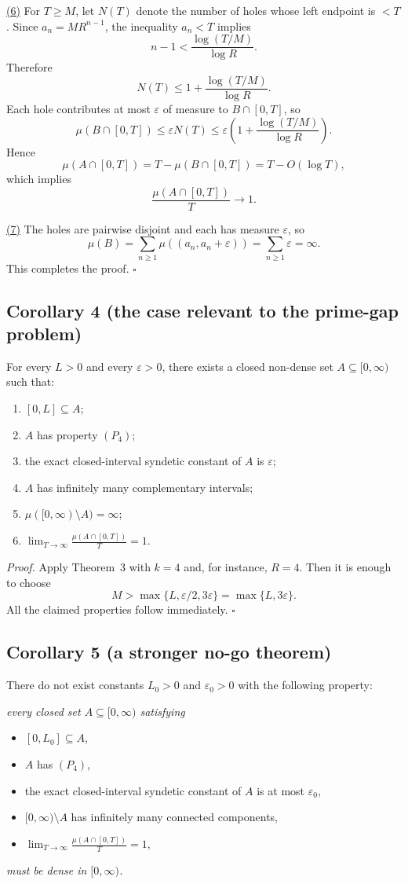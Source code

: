 \smallskip
\underline{(6)}
For $T\ge M$, let $N(T)$ denote the number of holes whose left endpoint is $<T$.
Since $a_n=MR^{n-1}$, the inequality $a_n<T$ implies
\[
 n-1<\frac{\log(T/M)}{\log R}.
\]
Therefore
\[
 N(T)\le 1+\frac{\log(T/M)}{\log R}.
\]
Each hole contributes at most $\varepsilon$ of measure to $B\cap[0,T]$, so
\[
\mu(B\cap[0,T])\le \varepsilon N(T)
\le \varepsilon\left(1+\frac{\log(T/M)}{\log R}\right).
\]
Hence
\[
\mu(A\cap[0,T])=T-\mu(B\cap[0,T])=T-O(\log T),
\]
which implies
\[
\frac{\mu(A\cap[0,T])}{T}\to 1.
\]

\smallskip
\underline{(7)}
The holes are pairwise disjoint and each has measure $\varepsilon$, so
\[
\mu(B)=\sum_{n\ge 1}\mu((a_n,a_n+\varepsilon))
=\sum_{n\ge 1}\varepsilon
=\infty.
\]
This completes the proof.
\hfill$\square$

\subsection*{Corollary 4 (the case relevant to the prime-gap problem)}
For every $L>0$ and every $\varepsilon>0$, there exists a closed non-dense set $A\subseteq[0,\infty)$ such that:

\begin{enumerate}
\item $[0,L]\subseteq A$;
\item $A$ has property $(P_4)$;
\item the exact closed-interval syndetic constant of $A$ is $\varepsilon$;
\item $A$ has infinitely many complementary intervals;
\item $\mu([0,\infty)\setminus A)=\infty$;
\item \(\displaystyle \lim_{T\to\infty}\frac{\mu(A\cap[0,T])}{T}=1\).
\end{enumerate}

\medskip
\noindent\emph{Proof.}
Apply Theorem~3 with $k=4$ and, for instance, $R=4$.
Then it is enough to choose
\[
M>\max\{L,\varepsilon/2,3\varepsilon\}=\max\{L,3\varepsilon\}.
\]
All the claimed properties follow immediately.
\hfill$\square$

\subsection*{Corollary 5 (a stronger no-go theorem)}
There do not exist constants $L_0>0$ and $\varepsilon_0>0$ with the following property:

\emph{every closed set $A\subseteq[0,\infty)$ satisfying}
\begin{itemize}
\item $[0,L_0]\subseteq A$,
\item $A$ has $(P_4)$,
\item the exact closed-interval syndetic constant of $A$ is at most $\varepsilon_0$,
\item $[0,\infty)\setminus A$ has infinitely many connected components,
\item \(\displaystyle \lim_{T\to\infty}\frac{\mu(A\cap[0,T])}{T}=1\),
\end{itemize}
\emph{must be dense in $[0,\infty)$.}

